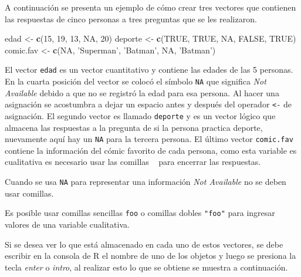 \documentclass[10pt,]{krantz}
\makeatletter
\newenvironment{Shaded}{\begin{snugshade}}{\end{snugshade}}
\newcommand{\KeywordTok}[1]{\textcolor[rgb]{0.13,0.29,0.53}{\textbf{#1}}}
\newcommand{\DecValTok}[1]{\textcolor[rgb]{0.00,0.00,0.81}{#1}}
\newcommand{\StringTok}[1]{\textcolor[rgb]{0.31,0.60,0.02}{#1}}
\newcommand{\OtherTok}[1]{\textcolor[rgb]{0.56,0.35,0.01}{#1}}
\newcommand{\NormalTok}[1]{#1}
\newenvironment{kframe}{%
\medskip{}
\setlength{\fboxsep}{.8em}
 \def\at@end@of@kframe{}%
 \ifinner\ifhmode%
  \def\at@end@of@kframe{\end{minipage}}%
  \begin{minipage}{\columnwidth}%
 \fi\fi%
 \def\FrameCommand##1{\hskip\@totalleftmargin \hskip-\fboxsep
 \colorbox{shadecolor}{##1}\hskip-\fboxsep
     \hskip-\linewidth \hskip-\@totalleftmargin \hskip\columnwidth}%
 \MakeFramed {\advance\hsize-\width
   \@totalleftmargin\z@ \linewidth\hsize
   \@setminipage}}%
 {\par\unskip\endMakeFramed%
 \at@end@of@kframe}
\renewenvironment{Shaded}{\begin{kframe}}{\end{kframe}}
\let\BeginKnitrBlock\begin \let\EndKnitrBlock\end
\makeatother
\begin{document}
A continuación se presenta un ejemplo de cómo crear tres vectores que
contienen las respuestas de cinco personas a tres preguntas que se les
realizaron.

\begin{Shaded}
\begin{Highlighting}[]
\NormalTok{edad <-}\StringTok{ }\KeywordTok{c}\NormalTok{(}\DecValTok{15}\NormalTok{, }\DecValTok{19}\NormalTok{, }\DecValTok{13}\NormalTok{, }\OtherTok{NA}\NormalTok{, }\DecValTok{20}\NormalTok{)}
\NormalTok{deporte <-}\StringTok{ }\KeywordTok{c}\NormalTok{(}\OtherTok{TRUE}\NormalTok{, }\OtherTok{TRUE}\NormalTok{, }\OtherTok{NA}\NormalTok{, }\OtherTok{FALSE}\NormalTok{, }\OtherTok{TRUE}\NormalTok{)}
\NormalTok{comic.fav <-}\StringTok{ }\KeywordTok{c}\NormalTok{(}\OtherTok{NA}\NormalTok{, }\StringTok{'Superman'}\NormalTok{, }\StringTok{'Batman'}\NormalTok{, }\OtherTok{NA}\NormalTok{, }\StringTok{'Batman'}\NormalTok{)}
\end{Highlighting}
\end{Shaded}

El vector \texttt{edad} es un vector cuantitativo y contiene las edades
de las 5 personas. En la cuarta posición del vector se colocó el símbolo
\texttt{NA} que significa \textit{Not Available} debido a que no se
registró la edad para esa persona. Al hacer una asignación se acostumbra
a dejar un espacio antes y después del operador \texttt{\textless{}-} de
asignación. El segundo vector es llamado \texttt{deporte} y es un vector
lógico que almacena las respuestas a la pregunta de si la persona
practica deporte, nuevamente aquí hay un \texttt{NA} para la tercera
persona. El último vector \texttt{comic.fav} contiene la información del
cómic favorito de cada persona, como esta variable es cualitativa es
necesario usar las comillas
\texttt{\textquotesingle{}\ \textquotesingle{}} para encerrar las
respuestas.

\BeginKnitrBlock{rmdwarning}
Cuando se usa \texttt{NA} para representar una información
\textit{Not Available} no se deben usar comillas.
\EndKnitrBlock{rmdwarning}

\BeginKnitrBlock{rmdnote}
Es posible usar comillas sencillas
\texttt{\textquotesingle{}foo\textquotesingle{}} o comillas dobles
\texttt{"foo"} para ingresar valores de una variable cualitativa.
\EndKnitrBlock{rmdnote}

Si se desea ver lo que está almacenado en cada uno de estos vectores, se
debe escribir en la consola de R el nombre de uno de los objetos y luego
se presiona la tecla \textit{enter} o \textit{intro}, al realizar esto
lo que se obtiene se muestra a continuación.
\end{document}
